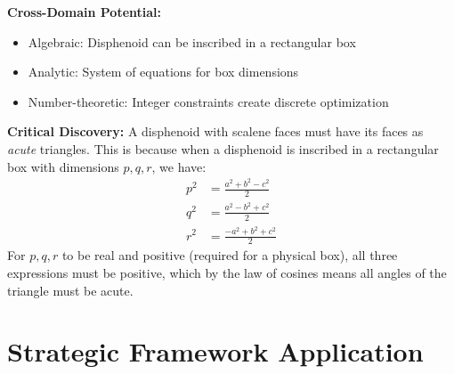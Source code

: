 \documentclass[12pt]{article}
\begin{document}
\begin{problemconfigbox}
\textbf{Cross-Domain Potential:}
\begin{itemize}
    \item Algebraic: Disphenoid can be inscribed in a rectangular box
    \item Analytic: System of equations for box dimensions
    \item Number-theoretic: Integer constraints create discrete optimization
\end{itemize}

\end{problemconfigbox}

\begin{keyinsight}
\textbf{Critical Discovery:} A disphenoid with scalene faces must have its faces as \textit{acute} triangles. This is because when a disphenoid is inscribed in a rectangular box with dimensions $p, q, r$, we have:
\begin{align*}
p^2 &= \frac{a^2 + b^2 - c^2}{2} \\
q^2 &= \frac{a^2 - b^2 + c^2}{2} \\
r^2 &= \frac{-a^2 + b^2 + c^2}{2}
\end{align*}
For $p, q, r$ to be real and positive (required for a physical box), all three expressions must be positive, which by the law of cosines means all angles of the triangle must be acute.
\end{keyinsight}

\section{Strategic Framework Application}
\end{document}
